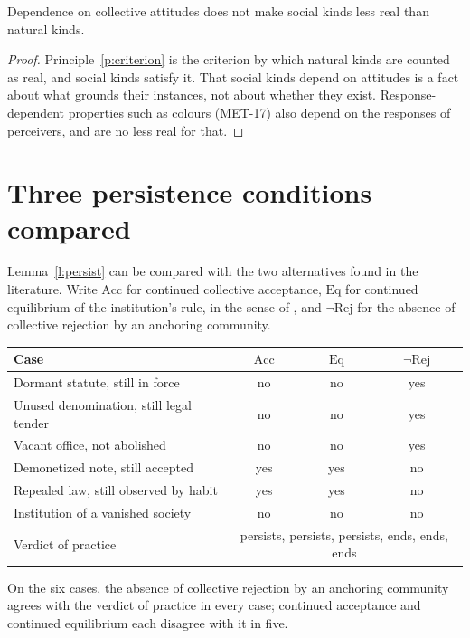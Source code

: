 \documentclass{situationist-preprint}
\begin{document}
\begin{corollary}\label{c:real}
Dependence on collective attitudes does not make social kinds less real than natural kinds.
\end{corollary}

\begin{proof}
Principle~\ref{p:criterion} is the criterion by which natural kinds are counted as real, and social kinds satisfy it. That social kinds depend on attitudes is a fact about what grounds their instances, not about whether they exist. Response-dependent properties such as colours (MET-17) also depend on the responses of perceivers, and are no less real for that.
\end{proof}

\section{Three persistence conditions compared}

Lemma~\ref{l:persist} can be compared with the two alternatives found in the literature. Write $\mathrm{Acc}$ for continued collective acceptance, $\mathrm{Eq}$ for continued equilibrium of the institution's rule, in the sense of \citet{GualaHindriks2015}, and $\neg\mathrm{Rej}$ for the absence of collective rejection by an anchoring community.

\begin{center}\small
\begin{tabular}{@{}lccc@{}}
\toprule
Case & $\mathrm{Acc}$ & $\mathrm{Eq}$ & $\neg\mathrm{Rej}$ \\
\midrule
Dormant statute, still in force & no & no & yes \\
Unused denomination, still legal tender & no & no & yes \\
Vacant office, not abolished & no & no & yes \\
Demonetized note, still accepted & yes & yes & no \\
Repealed law, still observed by habit & yes & yes & no \\
Institution of a vanished society & no & no & no \\
\midrule
Verdict of practice & \multicolumn{3}{c}{persists, persists, persists, ends, ends, ends} \\
\bottomrule
\end{tabular}
\end{center}

\begin{proposition}\label{p:compare}
On the six cases, the absence of collective rejection by an anchoring community agrees with the verdict of practice in every case; continued acceptance and continued equilibrium each disagree with it in five.
\end{proposition}
\end{document}
